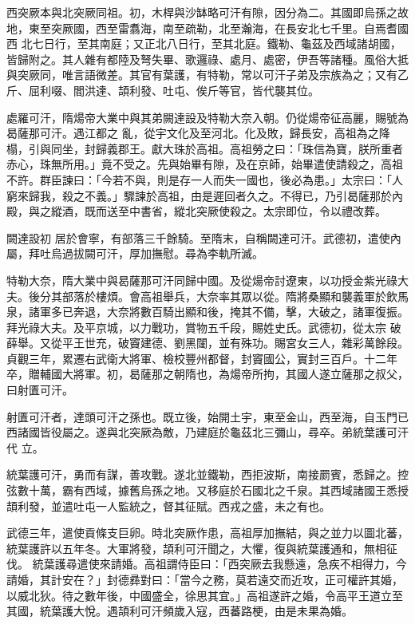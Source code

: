 
\begin{pinyinscope}

 西突厥本與北突厥同祖。初，木桿與沙缽略可汗有隙，因分為二。其國即烏孫之故地，東至突厥國，西至雷翥海，南至疏勒，北至瀚海，在長安北七千里。自焉耆國西
 北七日行，至其南庭；又正北八日行，至其北庭。鐵勒、龜茲及西域諸胡國，皆歸附之。其人雜有都陸及弩失畢、歌邏祿、處月、處密，伊吾等諸種。風俗大抵與突厥同，唯言語微差。其官有葉護，有特勒，常以可汗子弟及宗族為之；又有乙斤、屈利啜、閻洪達、頡利發、吐屯、俟斤等官，皆代襲其位。



 處羅可汗，隋煬帝大業中與其弟闕達設及特勒大奈入朝。仍從煬帝征高麗，賜號為曷薩那可汗。遇江都之
 亂，從宇文化及至河北。化及敗，歸長安，高祖為之降榻，引與同坐，封歸義郡王。獻大珠於高祖。高祖勞之曰：「珠信為寶，朕所重者赤心，珠無所用。」竟不受之。先與始畢有隙，及在京師，始畢遣使請殺之，高祖不許。群臣諫曰：「今若不與，則是存一人而失一國也，後必為患。」太宗曰：「人窮來歸我，殺之不義。」驟諫於高祖，由是遲回者久之。不得已，乃引曷薩那於內殿，與之縱酒，既而送至中書省，縱北突厥使殺之。太宗即位，令以禮改葬。



 闕達設初
 居於會寧，有部落三千餘騎。至隋末，自稱闕達可汗。武德初，遣使內屬，拜吐烏過拔闕可汗，厚加撫慰。尋為李軌所滅。



 特勒大奈，隋大業中與曷薩那可汗同歸中國。及從煬帝討遼東，以功授金紫光祿大夫。後分其部落於樓煩。會高祖舉兵，大奈率其眾以從。隋將桑顯和襲義軍於飲馬泉，諸軍多已奔退，大奈將數百騎出顯和後，掩其不備，擊，大破之，諸軍復振。拜光祿大夫。及平京城，以力戰功，賞物五千段，賜姓史氏。武德初，從太宗
 破薛舉。又從平王世充，破竇建德、劉黑闥，並有殊功。賜宮女三人，雜彩萬餘段。貞觀三年，累遷右武衛大將軍、檢校豐州都督，封竇國公，實封三百戶。十二年卒，贈輔國大將軍。初，曷薩那之朝隋也，為煬帝所拘，其國人遂立薩那之叔父，曰射匱可汗。



 射匱可汗者，達頭可汗之孫也。既立後，始開土宇，東至金山，西至海，自玉門已西諸國皆役屬之。遂與北突厥為敵，乃建庭於龜茲北三彌山，尋卒。弟統葉護可汗代
 立。



 統葉護可汗，勇而有謀，善攻戰。遂北並鐵勒，西拒波斯，南接罽賓，悉歸之。控弦數十萬，霸有西域，據舊烏孫之地。又移庭於石國北之千泉。其西域諸國王悉授頡利發，並遣吐屯一人監統之，督其征賦。西戎之盛，未之有也。



 武德三年，遣使貢條支巨卵。時北突厥作患，高祖厚加撫結，與之並力以圖北蕃，統葉護許以五年冬。大軍將發，頡利可汗聞之，大懼，復與統葉護通和，無相征伐。
 統葉護尋遣使來請婚。高祖謂侍臣曰：「西突厥去我懸遠，急疾不相得力，今請婚，其計安在？」封德彞對曰：「當今之務，莫若遠交而近攻，正可權許其婚，以威北狄。待之數年後，中國盛全，徐思其宜。」高祖遂許之婚，令高平王道立至其國，統葉護大悅。遇頡利可汗頻歲入寇，西蕃路梗，由是未果為婚。




\end{pinyinscope}

